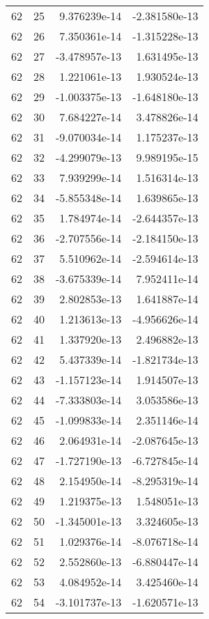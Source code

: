\begin{tabular}{rrrr}
  62 &   25 &  9.376239e-14 & -2.381580e-13 \\
  62 &   26 &  7.350361e-14 & -1.315228e-13 \\
  62 &   27 & -3.478957e-13 &  1.631495e-13 \\
  62 &   28 &  1.221061e-13 &  1.930524e-13 \\
  62 &   29 & -1.003375e-13 & -1.648180e-13 \\
  62 &   30 &  7.684227e-14 &  3.478826e-14 \\
  62 &   31 & -9.070034e-14 &  1.175237e-13 \\
  62 &   32 & -4.299079e-13 &  9.989195e-15 \\
  62 &   33 &  7.939299e-14 &  1.516314e-13 \\
  62 &   34 & -5.855348e-14 &  1.639865e-13 \\
  62 &   35 &  1.784974e-14 & -2.644357e-13 \\
  62 &   36 & -2.707556e-14 & -2.184150e-13 \\
  62 &   37 &  5.510962e-14 & -2.594614e-13 \\
  62 &   38 & -3.675339e-14 &  7.952411e-14 \\
  62 &   39 &  2.802853e-13 &  1.641887e-14 \\
  62 &   40 &  1.213613e-13 & -4.956626e-14 \\
  62 &   41 &  1.337920e-13 &  2.496882e-13 \\
  62 &   42 &  5.437339e-14 & -1.821734e-13 \\
  62 &   43 & -1.157123e-14 &  1.914507e-13 \\
  62 &   44 & -7.333803e-14 &  3.053586e-13 \\
  62 &   45 & -1.099833e-14 &  2.351146e-14 \\
  62 &   46 &  2.064931e-14 & -2.087645e-13 \\
  62 &   47 & -1.727190e-13 & -6.727845e-14 \\
  62 &   48 &  2.154950e-14 & -8.295319e-14 \\
  62 &   49 &  1.219375e-13 &  1.548051e-13 \\
  62 &   50 & -1.345001e-13 &  3.324605e-13 \\
  62 &   51 &  1.029376e-14 & -8.076718e-14 \\
  62 &   52 &  2.552860e-13 & -6.880447e-14 \\
  62 &   53 &  4.084952e-14 &  3.425460e-14 \\
  62 &   54 & -3.101737e-13 & -1.620571e-13 \\

\end{tabular}
